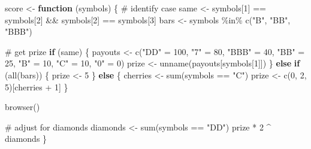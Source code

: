 \documentclass[
  letterpaper,
  DIV=11,
  numbers=noendperiod]{scrbook}
\newenvironment{Shaded}{\begin{snugshade}}{\end{snugshade}}
\newcommand{\CommentTok}[1]{\textcolor[rgb]{0.37,0.37,0.37}{#1}}
\newcommand{\ControlFlowTok}[1]{\textcolor[rgb]{0.00,0.23,0.31}{\textbf{#1}}}
\newcommand{\DecValTok}[1]{\textcolor[rgb]{0.68,0.00,0.00}{#1}}
\newcommand{\FunctionTok}[1]{\textcolor[rgb]{0.28,0.35,0.67}{#1}}
\newcommand{\NormalTok}[1]{\textcolor[rgb]{0.00,0.23,0.31}{#1}}
\newcommand{\OtherTok}[1]{\textcolor[rgb]{0.00,0.23,0.31}{#1}}
\newcommand{\SpecialCharTok}[1]{\textcolor[rgb]{0.37,0.37,0.37}{#1}}
\newcommand{\StringTok}[1]{\textcolor[rgb]{0.13,0.47,0.30}{#1}}
\begin{document}
\begin{Shaded}
\begin{Highlighting}[]
\NormalTok{score }\OtherTok{\textless{}{-}} \ControlFlowTok{function}\NormalTok{ (symbols) \{}
  \CommentTok{\# identify case}
\NormalTok{  same }\OtherTok{\textless{}{-}}\NormalTok{ symbols[}\DecValTok{1}\NormalTok{] }\SpecialCharTok{==}\NormalTok{ symbols[}\DecValTok{2}\NormalTok{] }\SpecialCharTok{\&\&}\NormalTok{ symbols[}\DecValTok{2}\NormalTok{] }\SpecialCharTok{==}\NormalTok{ symbols[}\DecValTok{3}\NormalTok{]}
\NormalTok{  bars }\OtherTok{\textless{}{-}}\NormalTok{ symbols }\SpecialCharTok{\%in\%} \FunctionTok{c}\NormalTok{(}\StringTok{"B"}\NormalTok{, }\StringTok{"BB"}\NormalTok{, }\StringTok{"BBB"}\NormalTok{)}
  
  \CommentTok{\# get prize}
  \ControlFlowTok{if}\NormalTok{ (same) \{}
\NormalTok{    payouts }\OtherTok{\textless{}{-}} \FunctionTok{c}\NormalTok{(}\StringTok{"DD"} \OtherTok{=} \DecValTok{100}\NormalTok{, }\StringTok{"7"} \OtherTok{=} \DecValTok{80}\NormalTok{, }\StringTok{"BBB"} \OtherTok{=} \DecValTok{40}\NormalTok{, }\StringTok{"BB"} \OtherTok{=} \DecValTok{25}\NormalTok{, }
      \StringTok{"B"} \OtherTok{=} \DecValTok{10}\NormalTok{, }\StringTok{"C"} \OtherTok{=} \DecValTok{10}\NormalTok{, }\StringTok{"0"} \OtherTok{=} \DecValTok{0}\NormalTok{)}
\NormalTok{    prize }\OtherTok{\textless{}{-}} \FunctionTok{unname}\NormalTok{(payouts[symbols[}\DecValTok{1}\NormalTok{]])}
\NormalTok{  \} }\ControlFlowTok{else} \ControlFlowTok{if}\NormalTok{ (}\FunctionTok{all}\NormalTok{(bars)) \{}
\NormalTok{    prize }\OtherTok{\textless{}{-}} \DecValTok{5}
\NormalTok{  \} }\ControlFlowTok{else}\NormalTok{ \{}
\NormalTok{    cherries }\OtherTok{\textless{}{-}} \FunctionTok{sum}\NormalTok{(symbols }\SpecialCharTok{==} \StringTok{"C"}\NormalTok{)}
\NormalTok{    prize }\OtherTok{\textless{}{-}} \FunctionTok{c}\NormalTok{(}\DecValTok{0}\NormalTok{, }\DecValTok{2}\NormalTok{, }\DecValTok{5}\NormalTok{)[cherries }\SpecialCharTok{+} \DecValTok{1}\NormalTok{]}
\NormalTok{  \}}
  
  \FunctionTok{browser}\NormalTok{()}

  \CommentTok{\# adjust for diamonds}
\NormalTok{  diamonds }\OtherTok{\textless{}{-}} \FunctionTok{sum}\NormalTok{(symbols }\SpecialCharTok{==} \StringTok{"DD"}\NormalTok{)}
\NormalTok{  prize }\SpecialCharTok{*} \DecValTok{2} \SpecialCharTok{\^{}}\NormalTok{ diamonds}
\NormalTok{\}}
\end{Highlighting}
\end{Shaded}
\end{document}
